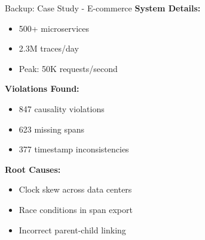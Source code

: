 \documentclass[aspectratio=169,xcolor=dvipsnames]{beamer}
\begin{document}
\begin{frame}{Backup: Case Study - E-commerce}
\textbf{System Details:}
\begin{itemize}
    \item 500+ microservices
    \item 2.3M traces/day
    \item Peak: 50K requests/second
\end{itemize}

\textbf{Violations Found:}
\begin{itemize}
    \item 847 causality violations
    \item 623 missing spans
    \item 377 timestamp inconsistencies
\end{itemize}

\textbf{Root Causes:}
\begin{itemize}
    \item Clock skew across data centers
    \item Race conditions in span export
    \item Incorrect parent-child linking
\end{itemize}
\end{frame}
\end{document}
